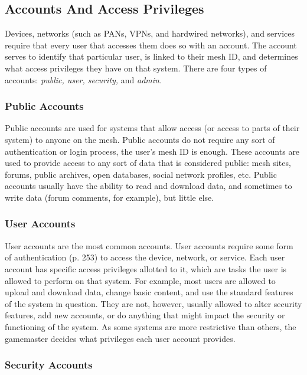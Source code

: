 \subsection{Accounts And Access Privileges}

Devices, networks (such as PANs, VPNs, and hardwired
networks), and services require that every user
that accesses them does so with an account. The 
account serves to identify that particular user, is 
linked to their mesh ID, and determines what access 
privileges they have on that system. There are four 
types of accounts: \textit{public, user, security,} and \textit{admin.}

\subsubsection{Public Accounts}

Public accounts are used for systems that allow 
access (or access to parts of their system) to anyone 
on the mesh. Public accounts do not require any sort 
of authentication or login process, the user's mesh ID 
is enough. These accounts are used to provide access 
to any sort of data that is considered public: mesh 
sites, forums, public archives, open databases, social 
network profiles, etc. Public accounts usually have 
the ability to read and download data, and sometimes
to write data (forum comments, for example),
but little else.

\subsubsection{User Accounts}

User accounts are the most common accounts. User 
accounts require some form of authentication (p. 253) 
to access the device, network, or service. Each user account
has specific access privileges allotted to it, which
are tasks the user is allowed to perform on that system. 
For example, most users are allowed to upload and 
download data, change basic content, and use the 
standard features of the system in question. They are 
not, however, usually allowed to alter security features, 
add new accounts, or do anything that might impact 
the security or functioning of the system. As some systems
are more restrictive than others, the gamemaster
decides what privileges each user account provides.

\subsubsection{Security Accounts}

